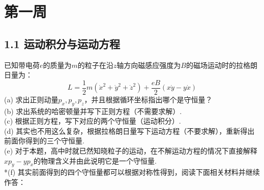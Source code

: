 \documentclass[UTF8,fontset=windows,oneside]{ctexbook}
\begin{document}
\section*{第一周}
\subsection*{1.1 运动积分与运动方程}
已知带电荷$e$的质量为$m$的粒子在沿$z$轴方向磁感应强度为$B$的磁场运动时的拉格朗日量为：
\[L=\frac{1}{2}m\left(\dot{x}^2+\dot{y}^2+\dot{z}^2\right)+\frac{eB}{2}(x\dot{y}-y\dot{x})\]
(a) 求出正则动量$p_x,p_y,p_z$，并且根据循环坐标指出哪个是守恒量？\\
(b) 求出系统的哈密顿量并写下正则方程（不需要求解）.\\
(c) 根据正则方程，写下对应的两个守恒量（运动积分）.\\
(d) 其实也不用这么复杂，根据拉格朗日量写下运动方程（不要求解），重新得出前面你得到的三个守恒量.\\
(e) 对于本题，高中时就已然知晓粒子的运动，在不解运动方程的情况下直接解释$x p_y-y p_x$的物理含义并由此说明它是一个守恒量.\\
*(f) 其实前面得到的四个守恒量都可以根据对称性得到，阅读下面相关材料并继续作答：
\end{document}
